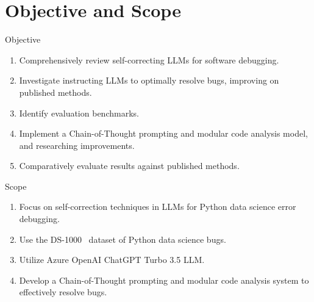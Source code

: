 \section{Objective and Scope}

\begin{frame}{Objective}
    \begin{enumerate}
        \item Comprehensively review self-correcting LLMs for software debugging.

        \item Investigate instructing LLMs to optimally resolve bugs, improving on published methods.

        \item Identify evaluation benchmarks.

        \item Implement a Chain-of-Thought prompting and modular code analysis model, and researching improvements.

        \item Comparatively evaluate results against published methods.
    \end{enumerate}
\end{frame}

\begin{frame}{Scope}
    \begin{enumerate}
        \item Focus on self-correction techniques in LLMs for Python data science error debugging.

        \item Use the DS-1000~\cite{pmlr-v202-lai23b} dataset of Python data science bugs.

        \item Utilize Azure OpenAI ChatGPT Turbo 3.5 LLM.

        \item Develop a Chain-of-Thought prompting and modular code analysis system to effectively resolve bugs.
    \end{enumerate}
\end{frame}

